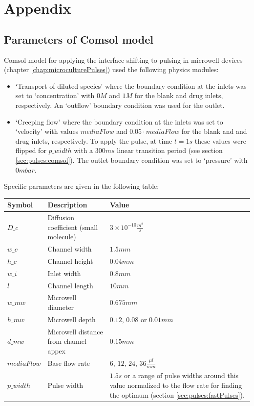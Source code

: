 \appendix
\chapter{Appendix}

	\section{Parameters of Comsol model}
    \label{app:comsolParams}
    Comsol model for applying the interface shifting to pulsing in microwell devices (chapter \ref{chap:microculturePulses}) used the following physics modules:
    \begin{itemize}
    \item `Transport of diluted species' where the boundary condition at the inlets was set to `concentration' with \(0M\) and \(1M\) for the blank and drug inlets, respectively. An `outflow' boundary condition was used for the outlet.

    \item `Creeping flow' where the boundary condition at the inlets was set to `velocity' with values \(mediaFlow\) and \(0.05\cdot mediaFlow\) for the blank and and drug inlets, respectively. To apply the pulse, at time \(t=1s\) these values were flipped for \(p\_width\) with a \(300ms\) linear transition period (see section \ref{sec:pulses:comsol}). The outlet boundary condition was set to `pressure' with \(0mbar\).
    \end{itemize}

    Specific parameters are given in the following table:

    \begin{tabular}{l l p{5cm}}
        \textbf{Symbo}l & \textbf{Description} & \textbf{Value} \\ \hline \hline
        \(D\_c\) & Diffusion coefficient (small molecule)      & \(3\times 10^{-10}\frac{m^2}{s}\) \\
        \(w\_c\) & Channel width  & \(1.5mm\)         \\
        \(h\_c\) & Channel height & \(0.04mm\)        \\
        \(w\_i\) & Inlet width    & \(0.8mm\)        \\
        \(l\)   & Channel length & \(10mm\)        \\
        \(w\_mw\) & Microwell diameter & \(0.675mm\) \\
        \(h\_mw\) & Microwell depth    & \(0.12\), \(0.08\) or \(0.01mm\) \\
        \(d\_mw\) & Microwell distance from channel appex & \(0.15mm\) \\
        \(mediaFlow\) & Base flow rate & \(6\), \(12\), \(24\), \(36\frac{\mu l}{min}\) \\
        \(p\_width\) & Pulse width & \(1.5s\) or a range of pulse widths around this value normalized to the flow rate for finding
                                             the optimum (section \ref{sec:pulses:fastPulses}). \\
    \end{tabular}

